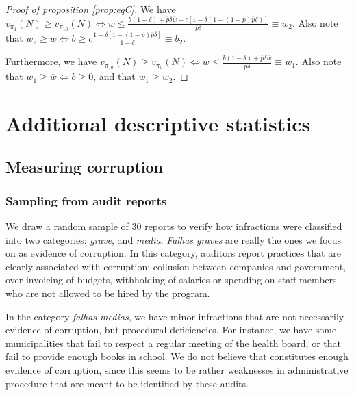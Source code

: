 \documentclass[12pt,a4paper]{article}
\theoremstyle{definition}
\newcommand{\wb}{\overline{w}}
\newcommand{\pb}{\overline{p}}
\newcommand{\de}{\delta}
\begin{document}
{\begin{proof}[Proof of proposition \ref{prop:eqC}]
    We have $v_{\pi_1}(N) \geq v_{\pi_{10}}(N) \iff w \leq \frac{b(1-\de)+\pb\de\wb-c[1-\de(1-(1-p)\pb\de)]}{\pb\de}  \equiv w_2$. Also note that $w_2 \geq \wb \iff b \geq c \frac{1-\de[1-(1-p)\pb\de]}{1-\de} \equiv b_2$. 

    Furthermore, we have $v_{\pi_{10}}(N) \geq v_{\pi_0}(N) \iff w \leq \frac{b(1-\de)+\pb\de\wb}{\pb\de}\equiv w_1$. Also note that $w_1 \geq \wb \iff b \geq 0$, and that $w_1 \geq w_2$.  

\end{proof}


\section{Additional descriptive statistics}
\label{app:descriptives}

\subsection{Measuring corruption}
\label{app:fault}

\subsubsection*{Sampling from audit reports} 

We draw a random sample of 30 reports to verify how infractions were classified into two categories: \textit{grave}, and \textit{media}. \textit{Falhas graves} are really the ones we focus on as evidence of corruption. In this category, auditors report practices that are clearly associated with corruption: collusion between companies and government, over invoicing of budgets, withholding of salaries or spending on staff members who are not allowed to be hired by the program.

In the category \textit{falhas medias}, we have minor infractions that are not necessarily evidence of corruption, but procedural deficiencies. For instance, we have  some municipalities that fail to respect a regular meeting of the health board, or that fail to provide enough books in school. We do not believe that constitutes enough evidence of corruption, since this seems to be rather weaknesses in administrative procedure that are meant to be identified by these audits.

}
\end{document}
